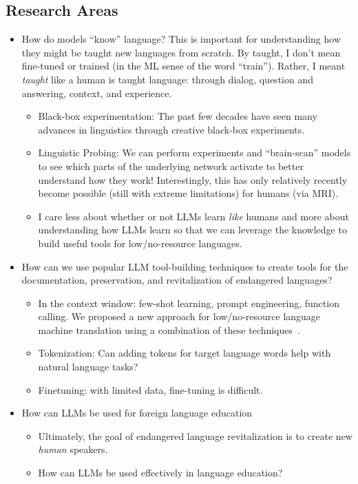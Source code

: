 \documentclass{article}
\begin{document}
\subsection*{Research Areas}
\begin{itemize}
    \item How do models ``know'' language? This is important for understanding how they might be taught new languages from scratch. By taught, I don't mean fine-tuned or trained (in the ML sense of the word ``train''). Rather, I meant \textit{taught} like a human is taught language: through dialog, question and answering, context, and experience.
    \begin{itemize}
        \item Black-box experimentation: The past few decades have seen many advances in linguistics through creative black-box experiments.
        \item Linguistic Probing: We can perform experiments and ``brain-scan'' models to see which parts of the underlying network activate to better understand how they work! Interestingly, this has only relatively recently become possible (still with extreme limitations) for humans (via MRI).
        \item I care less about whether or not LLMs learn \textit{like} humans and more about understanding how LLMs learn so that we can leverage the knowledge to build useful tools for low/no-resource languages.
    \end{itemize}
    \item How can we use popular LLM tool-building techniques to create tools for the documentation, preservation, and revitalization of endangered languages?
    \begin{itemize}
        \item In the context window: few-shot learning, prompt engineering, function calling. We proposed a new approach for low/no-resource language machine translation using a combination of these techniques~\cite{llm-rbmt}.
        \item Tokenization: Can adding tokens for target language words help with natural language tasks?
        \item Finetuning: with limited data, fine-tuning is difficult.
    \end{itemize}
    \item How can LLMs be used for foreign language education
    \begin{itemize}
        \item Ultimately, the goal of endangered language revitalization is to create new \textit{human} speakers.
        \item How can LLMs be used effectively in language education?
    \end{itemize}
\end{itemize}
\end{document}
